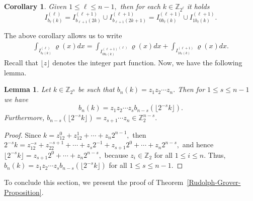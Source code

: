 \documentclass[a4paper,11pt]{article}
\newtheorem{corollary}[theorem]{Corollary}
\newtheorem{lemma}[theorem]{Lemma}
\begin{document}
  \begin{corollary}\label{corolario1}
   Given $1 \le \ell \le n-1,$ then for each $k \in \mathbb{Z}_{2^{\ell}}$ it holds
  $$
  I_{b_{\ell}(k)}^{(\ell)} = I_{b_{\ell+1}(2k)}^{(\ell+1)} \cup I_{b_{\ell+1}(2k+1)}^{(\ell+1)} = I_{0b_{\ell}(k)}^{(\ell+1)} \cup I_{1b_{\ell}(k)}^{(\ell+1)}.
  $$
  \end{corollary}

  The above corollary allows us to write
  \begin{align}\label{interval:decomposition}
      \int_{I_{b_{\ell}(k)}^{(\ell)}} \varrho(x) dx =   \int_{{I_{0b_{\ell}(k)}^{(\ell+1)}}^{(\ell)}} \varrho(x) dx  +  \int_{I_{1b_{\ell}(k)}^{(\ell+1)}} \varrho(x) dx.
  \end{align}
  Recall that $\lfloor z \rfloor$ denotes the integer part function. Now, we have the following lemma.
  
  \begin{lemma}\label{lemma:decomposition}
  Let $k \in \mathbb{Z}_{2^n}$ be such that $b_n(k)=z_1z_2\cdots z_n.$ Then for $1 \le s \le n-1$ we have $$ b_n(k) = z_1 z_2 \cdots z_{s}  b_{n-s}(\lfloor 2^{-s}k \rfloor).
  $$
  Furthermore, $b_{n-s}(\lfloor 2^{-s}k \rfloor) = z_{s+1} \cdots z_n \in \mathbb{Z}_2^{n-s}.$
  \end{lemma}

\begin{proof}
Since $k = z_12^0+z_12^1+\cdots + z_n 2^{n-1},$ then $2^{-s}k =  z_12^{-s}+z_22^{-s+1}+\cdots +z_{s}2^{-1} + z_{s+1}2^0 +\cdots+z_n 2^{n-s},$ and
hence $\lfloor 2^{-s}k \rfloor = z_{s+1}2^0 +\cdots+z_n 2^{n-s},$ because $z_i \in \mathbb{Z}_2$ for all $1\leq i \leq n.$ Thus,
$b_n(k) = z_1z_2\cdots z_s b_{n-s}(\lfloor 2^{-s}k \rfloor)$ for all $1 \le s \le n-1.$ 
\end{proof}

To conclude this section, we present the proof of Theorem~\ref{Rudolph-Grover-Proposition}.
   
\end{document}
